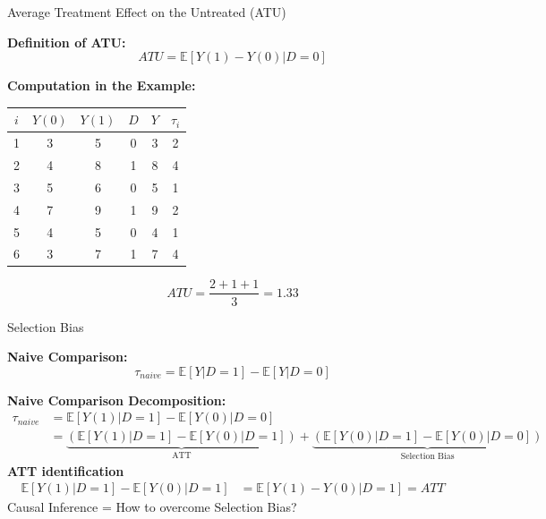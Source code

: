 \documentclass[xcolor=svgnames,t]{beamer}
\begin{document}
\begin{frame}{Average Treatment Effect on the Untreated (ATU)}

    \textbf{Definition of ATU:}
    \[
    ATU = \mathbb{E}[Y(1) - Y(0) | D = 0]
    \]
    
    \pause
    \textbf{Computation in the Example:}
    
    \centering
    \begin{table}[]
    \centering
    \begin{tabular}{|c|c|c|c|c|c|}
    \hline
    \( i \) & \( Y(0) \) & \( Y(1) \) & \( D \) & \( Y \) & \( \tau_i \) \\ \hline
    \rowcolor{blue!20} 1 & 3  & 5  & 0 & 3 & 2 \\ \hline
    2 & 4  & 8  & 1 & 8 & 4 \\ \hline
    \rowcolor{blue!20} 3 & 5  & 6  & 0 & 5 & 1 \\ \hline
    4 & 7  & 9  & 1 & 9 & 2 \\ \hline
    \rowcolor{blue!20} 5 & 4  & 5  & 0 & 4 & 1 \\ \hline
    6 & 3  & 7  & 1 & 7 & 4 \\ \hline
    \end{tabular}
    \end{table}
    \pause
    \vspace{0.3cm}
    \[
        ATU = \frac{2 + 1 + 1}{3} = 1.33
    \]

\end{frame}

\begin{frame}{Selection Bias}
    
    \textbf{Naive Comparison:}
    \[
    \tau_{naive} = \mathbb{E}[Y | D = 1] - \mathbb{E}[Y | D = 0]
    \]
    
    \vspace{0.5cm}
    \pause
    \textbf{Naive Comparison Decomposition:}
    \small{
        \begin{align*}
            \tau_{naive} &= \mathbb{E}[Y(1) | D = 1] - \mathbb{E}[Y(0) | D = 0] \\
            &= \underbrace{\left(\mathbb{E}[Y(1) | D = 1] - \mathbb{E}[Y(0) | D = 1]\right)}_{\text{ATT}} 
            + \underbrace{\left(\mathbb{E}[Y(0) | D = 1] - \mathbb{E}[Y(0) | D = 0]\right)}_{\text{Selection Bias}}
        \end{align*}
        }
        \pause
        \textbf{ATT identification}     
        \small{
            \begin{align*}
                \mathbb{E}[Y(1) | D = 1] - \mathbb{E}[Y(0) | D = 1] &= \mathbb{E}[Y(1) - Y(0) | D = 1]=ATT 
            \end{align*}
            }
Causal Inference = How to overcome Selection Bias?
\end{frame}
\end{document}
